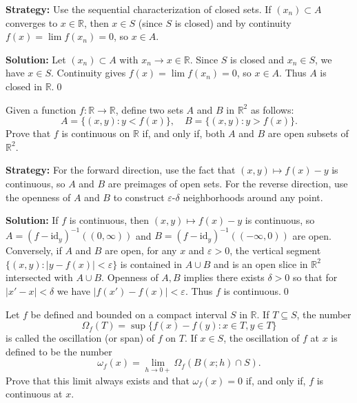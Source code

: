 \noindent\textbf{Strategy:} Use the sequential characterization of closed sets. If $(x_n) \subset A$ converges to $x \in \mathbb{R}$, then $x \in S$ (since $S$ is closed) and by continuity $f(x) = \lim f(x_n) = 0$, so $x \in A$.

\bigskip\noindent\textbf{Solution:}
Let $(x_n)\subset A$ with $x_n\to x\in\mathbb{R}$. Since $S$ is closed and $x_n\in S$, we have $x\in S$. Continuity gives $f(x)=\lim f(x_n)=0$, so $x\in A$. Thus $A$ is closed in $\mathbb{R}$.\qed



\begin{problembox}
Given a function \( f: \mathbb{R} \to \mathbb{R} \), define two sets \( A \) and \( B \) in \( \mathbb{R}^2 \) as follows:
\[A = \{(x, y) : y < f(x)\}, \quad B = \{(x, y) : y > f(x)\}.\]
Prove that \( f \) is continuous on \( \mathbb{R} \) if, and only if, both \( A \) and \( B \) are open subsets of \( \mathbb{R}^2 \).
\end{problembox}

\noindent\textbf{Strategy:} For the forward direction, use the fact that $(x,y) \mapsto f(x) - y$ is continuous, so $A$ and $B$ are preimages of open sets. For the reverse direction, use the openness of $A$ and $B$ to construct $\varepsilon$-$\delta$ neighborhoods around any point.

\bigskip\noindent\textbf{Solution:}
If $f$ is continuous, then $(x,y)\mapsto f(x)-y$ is continuous, so $A=(f-\mathrm{id}_y)^{-1}((0,\infty))$ and $B=(f-\mathrm{id}_y)^{-1}(({-}\infty,0))$ are open. Conversely, if $A$ and $B$ are open, for any $x$ and $\varepsilon>0$, the vertical segment $\{(x,y):|y-f(x)|<\varepsilon\}$ is contained in $A\cup B$ and is an open slice in $\mathbb{R}^2$ intersected with $A\cup B$. Openness of $A,B$ implies there exists $\delta>0$ so that for $|x'-x|<\delta$ we have $|f(x')-f(x)|<\varepsilon$. Thus $f$ is continuous.\qed



\begin{problembox}
Let \( f \) be defined and bounded on a compact interval \( S \) in \( \mathbb{R} \). If \( T \subseteq S \), the number
\[\Omega_f(T) = \sup \{f(x) - f(y) : x \in T, y \in T\}\]
is called the oscillation (or span) of \( f \) on \( T \). If \( x \in S \), the oscillation of \( f \) at \( x \) is defined to be the number
\[\omega_f(x) = \lim_{h \to 0+} \Omega_f(B(x; h) \cap S).\]
Prove that this limit always exists and that \( \omega_f(x) = 0 \) if, and only if, \( f \) is continuous at \( x \).
\end{problembox}

